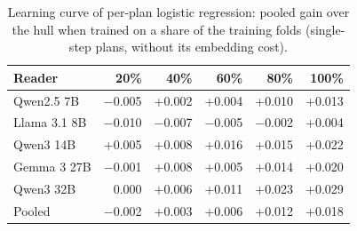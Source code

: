 \begin{table}[t]
\centering\small
\setlength{\tabcolsep}{4pt}
\caption{Learning curve of per-plan logistic regression: pooled gain over the hull when trained on a share of the training folds (single-step plans, without its embedding cost).}
\label{tab:robust_curve}
\begin{tabular*}{\linewidth}{@{\extracolsep{\fill}}lrrrrr}
\toprule
Reader & 20\% & 40\% & 60\% & 80\% & 100\% \\
\midrule
Qwen2.5 7B & $-$0.005 & +0.002 & +0.004 & +0.010 & +0.013 \\
Llama 3.1 8B & $-$0.010 & $-$0.007 & $-$0.005 & $-$0.002 & +0.004 \\
Qwen3 14B & +0.005 & +0.008 & +0.016 & +0.015 & +0.022 \\
Gemma 3 27B & $-$0.001 & +0.008 & +0.005 & +0.014 & +0.020 \\
Qwen3 32B & 0.000 & +0.006 & +0.011 & +0.023 & +0.029 \\
Pooled & $-$0.002 & +0.003 & +0.006 & +0.012 & +0.018 \\
\bottomrule
\end{tabular*}
\end{table}
